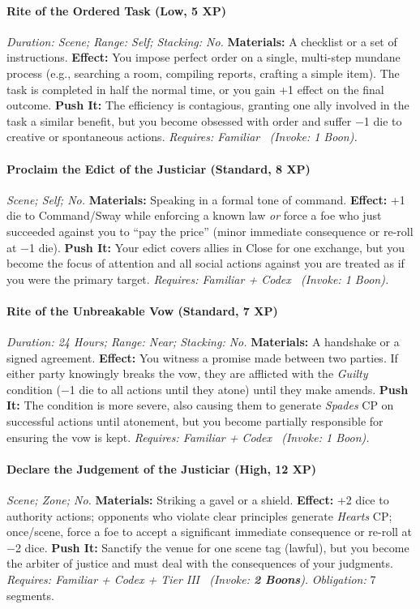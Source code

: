 \documentclass[12pt,twoside]{book}
\begin{document}
\paragraph{Rite of the Ordered Task (Low, 5 XP)} \emph{Duration: Scene; Range: Self; Stacking: No.}
\textbf{Materials:} A checklist or a set of instructions.
\textbf{Effect:} You impose perfect order on a single, multi-step mundane process (e.g., searching a room, compiling reports, crafting a simple item). The task is completed in half the normal time, or you gain +1 effect on the final outcome.
\textbf{Push It:} The efficiency is contagious, granting one ally involved in the task a similar benefit, but you become obsessed with order and suffer −1 die to creative or spontaneous actions.
\emph{Requires: Familiar \ (\textit{Invoke:} 1 Boon).}
\paragraph{Proclaim the Edict of the Justiciar (Standard, 8 XP)} \emph{Scene; Self; No.}
\textbf{Materials:} Speaking in a formal tone of command.
\textbf{Effect:} +1 die to Command/Sway while enforcing a known law \emph{or} force a foe who just succeeded against you to ``pay the price'' (minor immediate consequence or re-roll at −1 die).
\textbf{Push It:} Your edict covers allies in Close for one exchange, but you become the focus of attention and all social actions against you are treated as if you were the primary target.
\emph{Requires: Familiar + Codex \ (\textit{Invoke:} 1 Boon).}
\paragraph{Rite of the Unbreakable Vow (Standard, 7 XP)} \emph{Duration: 24 Hours; Range: Near; Stacking: No.}
\textbf{Materials:} A handshake or a signed agreement.
\textbf{Effect:} You witness a promise made between two parties. If either party knowingly breaks the vow, they are afflicted with the \emph{Guilty} condition (−1 die to all actions until they atone) until they make amends.
\textbf{Push It:} The condition is more severe, also causing them to generate \emph{Spades} CP on successful actions until atonement, but you become partially responsible for ensuring the vow is kept.
\emph{Requires: Familiar + Codex \ (\textit{Invoke:} 1 Boon).}
\paragraph{Declare the Judgement of the Justiciar (High, 12 XP)} \emph{Scene; Zone; No.}
\textbf{Materials:} Striking a gavel or a shield.
\textbf{Effect:} +2 dice to authority actions; opponents who violate clear principles generate \emph{Hearts} CP; once/scene, force a foe to accept a significant immediate consequence or re-roll at −2 dice.
\textbf{Push It:} Sanctify the venue for one scene tag (lawful), but you become the arbiter of justice and must deal with the consequences of your judgments.
\emph{Requires: Familiar + Codex + Tier III \ (\textit{Invoke:} \textbf{2 Boons}).}
\emph{Obligation:} 7 segments.
\end{document}
